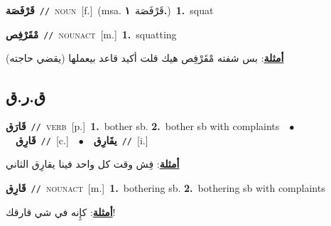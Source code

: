 \documentclass[10pt,a4paper,twoside]{article} %
\begin{document}
\begin{multicols}{2}
{\setlength\topsep{0pt}\textbf{\foreignlanguage{arabic}{قَرْفَصَة}}\ {\color{gray}\texttt{//}\color{black}}\ \textsc{noun}\ [f.]\ \color{gray}(msa. \foreignlanguage{arabic}{قَرْفَصَة}~\foreignlanguage{arabic}{\textbf{١.}})\color{black}\ \textbf{1.}~squat\ } \vspace{2mm}

{\setlength\topsep{0pt}\textbf{\foreignlanguage{arabic}{مْقَرْفِص}}\ {\color{gray}\texttt{//}\color{black}}\ \textsc{noun\textunderscore act}\ [m.]\ \textbf{1.}~squatting\  \begin{flushright}\color{gray}\foreignlanguage{arabic}{\textbf{\underline{\foreignlanguage{arabic}{أمثلة}}}: بس شفته مْقَرْفِص هيك قلت أكيد قاعد بيعملها (يقضي حاجته)}\end{flushright}\color{black}} \vspace{2mm}

\vspace{-3mm}
\subsection*{\color{blue}\foreignlanguage{arabic}{ق.ر.ق}\color{blue}{}} 

{\setlength\topsep{0pt}\textbf{\foreignlanguage{arabic}{قَارَق}}\ {\color{gray}\texttt{//}\color{black}}\ \textsc{verb}\ [p.]\ \textbf{1.}~bother sb.  \textbf{2.}~bother sb with complaints\ \ $\bullet$\ \ \setlength\topsep{0pt}\textbf{\foreignlanguage{arabic}{قَارِق}}\ {\color{gray}\texttt{//}\color{black}}\ [c.]\ \ $\bullet$\ \ \setlength\topsep{0pt}\textbf{\foreignlanguage{arabic}{يقَارِق}}\ {\color{gray}\texttt{//}\color{black}}\ [i.]\  \begin{flushright}\color{gray}\foreignlanguage{arabic}{\textbf{\underline{\foreignlanguage{arabic}{أمثلة}}}: فِش وقت كل واحد فينا يقارِق الثاني}\end{flushright}\color{black}} \vspace{2mm}

{\setlength\topsep{0pt}\textbf{\foreignlanguage{arabic}{قَارِق}}\ {\color{gray}\texttt{//}\color{black}}\ \textsc{noun\textunderscore act}\ [m.]\ \textbf{1.}~bothering sb.  \textbf{2.}~bothering sb with complaints\  \begin{flushright}\color{gray}\foreignlanguage{arabic}{\textbf{\underline{\foreignlanguage{arabic}{أمثلة}}}: كإِنه في شي قارقك!}\end{flushright}\color{black}} \vspace{2mm}


\end{multicols}
\end{document}
